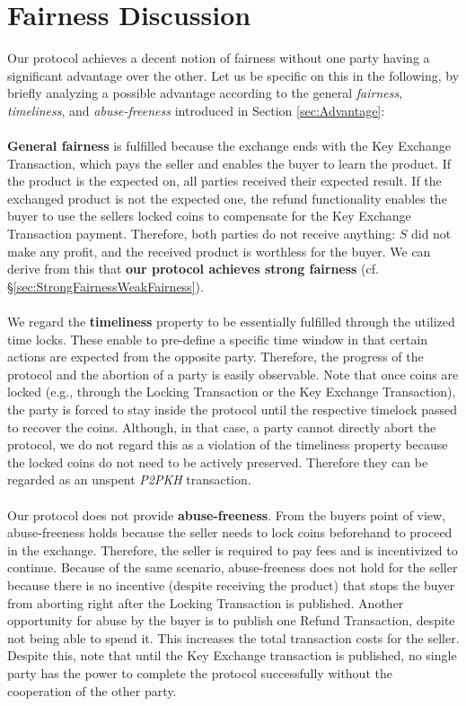 \documentclass{cacthesis}
\newcounter{protocol}
\begin{document}
        
        \section{Fairness Discussion}
        \label{sec:FairnessDiscussion}
	    Our protocol achieves a decent notion of fairness without one party having a significant advantage over the other. Let us be specific on this in the following, by briefly analyzing a possible advantage according to the general \textit{fairness}, \textit{timeliness}, and \textit{abuse-freeness} introduced in Section \ref{sec:Advantage}: \\\\
        \textbf{General fairness} is fulfilled because the exchange ends with the Key Exchange Transaction, which pays the seller and enables the buyer to learn the product. If the product is the expected on, all parties received their expected result. If the exchanged product is not the expected one, the refund functionality enables the buyer to use the sellers locked coins to compensate for the Key Exchange Transaction payment. Therefore, both parties do not receive anything: $S$ did not make any profit, and the received product is worthless for the buyer. We can derive from this that \textbf{our protocol achieves strong fairness} (cf. §\ref{sec:StrongFairnessWeakFairness}). \\\\
        We regard the \textbf{timeliness} property to be essentially fulfilled through the utilized time locks. These enable to pre-define a specific time window in that certain actions are expected from the opposite party. Therefore, the progress of the protocol and the abortion of a party is easily observable. Note that once coins are locked (e.g., through the Locking Transaction or the Key Exchange Transaction), the party is forced to stay inside the protocol until the respective timelock passed to recover the coins. Although, in that case, a party cannot directly abort the protocol, we do not regard this as a violation of the timeliness property because the locked coins do not need to be actively preserved. Therefore they can be regarded as an unspent \textit{P2PKH} transaction. \\\\
        Our protocol does not provide \textbf{abuse-freeness}. From the buyers point of view, abuse-freeness holds because the seller needs to lock coins beforehand to proceed in the exchange. Therefore, the seller is required to pay fees and is incentivized to continue. Because of the same scenario, abuse-freeness does not hold for the seller because there is no incentive (despite receiving the product) that stops the buyer from aborting right after the Locking Transaction is published. Another opportunity for abuse by the buyer is to publish one Refund Transaction, despite not being able to spend it. This increases the total transaction costs for the seller. Despite this, note that until the Key Exchange transaction is published, no single party has the power to complete the protocol successfully without the cooperation of the other party. \\\\
\end{document}
